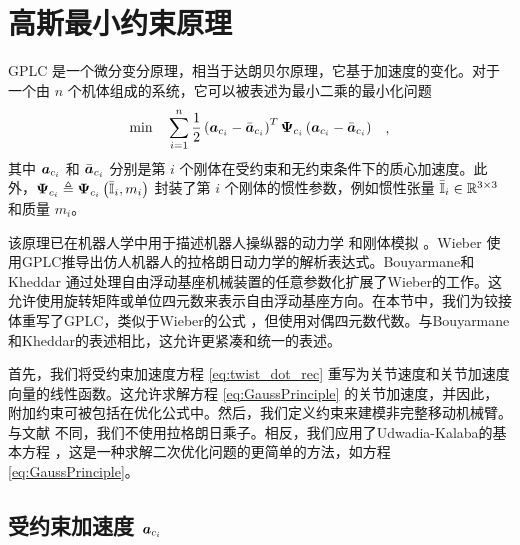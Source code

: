
\section{\normalfont\bfseries 高斯最小约束原理\label{sec:Gauss-Principle}}

GPLC \cite{Kalaba1993} 是一个微分变分原理，相当于达朗贝尔原理，它基于加速度的变化。对于一个由 $n$ 个机体组成的系统，它可以被表述为最小二乘的最小化问题
\begin{gather}
\begin{aligned} & \underset{}{\min} & & \sum_{i=1}^{n}\frac{1}{2}\left(\boldsymbol{a}_{c_{i}}-\bar{\boldsymbol{a}}_{c_{i}}\right)^{T}\boldsymbol{\Psi}_{c_{i}}\left(\boldsymbol{a}_{c_{i}}-\bar{\boldsymbol{a}}_{c_{i}}\right) \end{aligned},\label{eq:GaussPrinciple}
\end{gather}
其中 $\boldsymbol{a}_{c_{i}}$ 和 $\bar{\boldsymbol{a}}_{c_{i}}$ 分别是第 $i$ 个刚体在受约束和无约束条件下的质心加速度。此外，$\boldsymbol{\Psi}_{c_{i}}\triangleq\boldsymbol{\Psi}_{c_{i}}\left(\bar{\boldsymbol{\mathbb{I}}}_{i},m_{i}\right)$ 封装了第 $i$ 个刚体的惯性参数，例如惯性张量 $\bar{\boldsymbol{\mathbb{I}}}_{i}\in\mathbb{R}^{3\times3}$ 和质量 $m_{i}$。

该原理已在机器人学中用于描述机器人操纵器的动力学 \cite{Bruyninckx2000a} 和刚体模拟 \cite{Redon2002}。Wieber \cite{Wieber2006} 使用GPLC推导出仿人机器人的拉格朗日动力学的解析表达式。Bouyarmane和Kheddar \cite{Bouyarmane2012} 通过处理自由浮动基座机械装置的任意参数化扩展了Wieber的工作。这允许使用旋转矩阵或单位四元数来表示自由浮动基座方向。在本节中，我们为铰接体重写了GPLC，类似于Wieber的公式 \cite{Wieber2006}，但使用对偶四元数代数。与Bouyarmane和Kheddar\cite{Bouyarmane2012}的表述相比，这允许更紧凑和统一的表述。

首先，我们将受约束加速度方程 \eqref{eq:twist_dot_rec} 重写为关节速度和关节加速度向量的线性函数。这允许求解方程 \eqref{eq:GaussPrinciple} 的关节加速度，并因此，附加约束可被包括在优化公式中。然后，我们定义约束来建模非完整移动机械臂。与文献 \cite{Bouyarmane2012} 不同，我们不使用拉格朗日乘子。相反，我们应用了Udwadia-Kalaba的基本方程 \cite{FirdausE.UdwadiaandRobertE.Kalaba1992}，这是一种求解二次优化问题的更简单的方法，如方程 \eqref{eq:GaussPrinciple}。

\subsection{\normalfont\bfseries 受约束加速度 $\protect\boldsymbol{a}_{c_{i}}$\label{subsec:Constrained-acceleration}}

